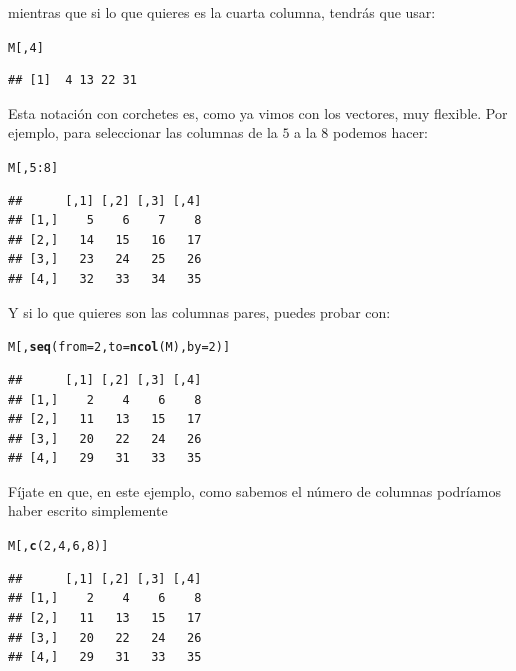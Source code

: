 \documentclass[10pt,a4paper]{article}\usepackage[]{graphicx}\usepackage[]{color}
\makeatletter
\newcommand{\hlnum}[1]{\textcolor[rgb]{0.686,0.059,0.569}{#1}}%
\newcommand{\hlopt}[1]{\textcolor[rgb]{0,0,0}{#1}}%
\newcommand{\hlstd}[1]{\textcolor[rgb]{0.345,0.345,0.345}{#1}}%
\newcommand{\hlkwc}[1]{\textcolor[rgb]{0.333,0.667,0.333}{#1}}%
\newcommand{\hlkwd}[1]{\textcolor[rgb]{0.737,0.353,0.396}{\textbf{#1}}}%
\newenvironment{kframe}{%
 \def\at@end@of@kframe{}%
 \ifinner\ifhmode%
  \def\at@end@of@kframe{\end{minipage}}%
  \begin{minipage}{\columnwidth}%
 \fi\fi%
 \def\FrameCommand##1{\hskip\@totalleftmargin \hskip-\fboxsep
 \colorbox{shadecolor}{##1}\hskip-\fboxsep
     \hskip-\linewidth \hskip-\@totalleftmargin \hskip\columnwidth}%
 \MakeFramed {\advance\hsize-\width
   \@totalleftmargin\z@ \linewidth\hsize
   \@setminipage}}%
 {\par\unskip\endMakeFramed%
 \at@end@of@kframe}
\newenvironment{knitrout}{}{} %
\makeatother
\begin{document}
mientras que si lo que quieres es la cuarta columna, tendrás que usar:
\begin{knitrout}
\color{fgcolor}\begin{kframe}
\begin{alltt}
    \hlstd{M[ ,} \hlnum{4}\hlstd{]}
\end{alltt}
\begin{verbatim}
## [1]  4 13 22 31
\end{verbatim}
\end{kframe}
\end{knitrout}
Esta notación con corchetes es, como ya vimos con los vectores, muy flexible. Por ejemplo, para seleccionar las columnas de la $5$ a la $8$ podemos hacer:
\begin{knitrout}
\color{fgcolor}\begin{kframe}
\begin{alltt}
    \hlstd{M[ ,} \hlnum{5}\hlopt{:}\hlnum{8}\hlstd{]}
\end{alltt}
\begin{verbatim}
##      [,1] [,2] [,3] [,4]
## [1,]    5    6    7    8
## [2,]   14   15   16   17
## [3,]   23   24   25   26
## [4,]   32   33   34   35
\end{verbatim}
\end{kframe}
\end{knitrout}
Y si lo que quieres son las columnas pares, puedes probar con:
\begin{knitrout}
\color{fgcolor}\begin{kframe}
\begin{alltt}
    \hlstd{M[ ,} \hlkwd{seq}\hlstd{(}\hlkwc{from}\hlstd{=}\hlnum{2}\hlstd{,} \hlkwc{to}\hlstd{=}\hlkwd{ncol}\hlstd{(M),} \hlkwc{by}\hlstd{=}\hlnum{2}\hlstd{)]}
\end{alltt}
\begin{verbatim}
##      [,1] [,2] [,3] [,4]
## [1,]    2    4    6    8
## [2,]   11   13   15   17
## [3,]   20   22   24   26
## [4,]   29   31   33   35
\end{verbatim}
\end{kframe}
\end{knitrout}
Fíjate en que, en este ejemplo, como sabemos el número de columnas podríamos haber escrito simplemente
\begin{knitrout}
\color{fgcolor}\begin{kframe}
\begin{alltt}
    \hlstd{M[ ,} \hlkwd{c}\hlstd{(}\hlnum{2}\hlstd{,}\hlnum{4}\hlstd{,}\hlnum{6}\hlstd{,}\hlnum{8}\hlstd{)]}
\end{alltt}
\begin{verbatim}
##      [,1] [,2] [,3] [,4]
## [1,]    2    4    6    8
## [2,]   11   13   15   17
## [3,]   20   22   24   26
## [4,]   29   31   33   35
\end{verbatim}
\end{kframe}
\end{knitrout}
\end{document}
